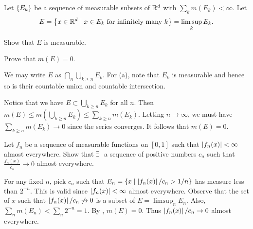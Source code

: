 \begin{exercise}
    Let $\left\{ {E_k} \right\}$ be a sequence of measurable subsets of 
    $\mathbb{R}^d$ with $\sum_k m(E_k)<\infty$. Let 
    \[
        E = 
        \left\{ x\in\mathbb{R}^d \;\middle\vert\; x\in E_k\text{ for infinitely many }k \right\}
        = \limsup_k E_k.
    \]
    \begin{thmenum}
        \item Show that $E$ is measurable.
        \item Prove that $m(E) = 0$.
    \end{thmenum}
\end{exercise}
\begin{pf}
    We may write $E$ as $\bigcap_n\bigcup_{k\geq n}E_k$. For 
    (a), note that $E_k$ is measurable and hence so is their 
    countable union and countable intersection. 

    Notice that we have $E\subset\bigcup_{k\geq n}E_k$ for all
    $n$. Then $m(E)\leq m(\bigcup_{k\geq n}E_k)\leq 
    \sum_{k\geq n}m(E_k)$. Letting $n\to\infty$, we must have 
    $\sum_{k\geq n}m(E_k)\to 0$ since the series converges. It 
    follows that $m(E) = 0$.
\end{pf}

\begin{exercise}
    Let $f_n$ be a sequence of measurable functions on $[0,1]$ 
    such that $\left\lvert {f_n(x)} \right\rvert<\infty$ almost everywhere. Show 
    that $\exists\:$ a sequence of positive numbers $c_n$ such 
    that $\frac{f_n(x)}{c_n}\to 0$ almost everywhere.
\end{exercise}
\begin{pf}
    For any fixed $n$, pick $c_n$ such that $E_n = 
    \left\{ x \;\middle\vert\; \left\lvert {f_n(x)} \right\rvert/c_n > 1/n \right\}$ has measure less than 
    $2^{-n}$. This is valid since $\left\lvert {f_n(x)} \right\rvert<\infty$ 
    almost everywhere. Observe that the set of $x$ such that 
    $\left\lvert {f_n(x)} \right\rvert/c_n\not\to 0$ is a subset of 
    $E = \limsup_n E_n$. Also, $\sum_n m(E_n)<\sum_n 2^{-n} = 1$.
    By , $m(E)=0$. Thus $\left\lvert {f_n(x)} \right\rvert/c_n\to 0$ 
    almost everywhere.
\end{pf}

